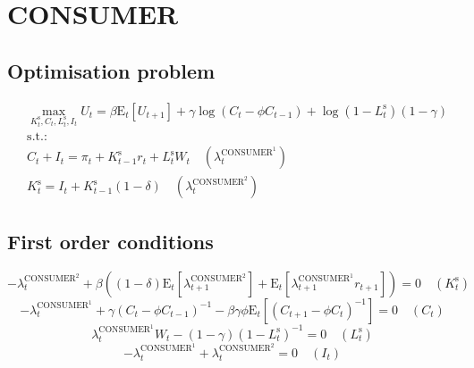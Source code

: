 

\section{CONSUMER}

\subsection{Optimisation problem}

\begin{align}
&\max_{K^{\mathrm{s}}_{t}, C_{t}, L^{\mathrm{s}}_{t}, I_{t}
} U_{t} = {\beta} {\mathrm{E}_{t}\left[U_{t+1}\right]} + {\gamma} {\log\left(C_{t} - {\phi} {C_{t-1}}\right)} + {\log\left(1 - L^{\mathrm{s}}_{t}\right)} \left(1 - \gamma\right)\\
&\mathrm{s.t.:}\nonumber\\
& C_{t} + I_{t} = \pi_{t} + {K^{\mathrm{s}}_{t-1}} {r_{t}} + {L^{\mathrm{s}}_{t}} {W_{t}} \quad \left(\lambda^{\mathrm{CONSUMER}^{\mathrm{1}}}_{t}\right)\\
& K^{\mathrm{s}}_{t} = I_{t} + {K^{\mathrm{s}}_{t-1}} \left(1 - \delta\right) \quad \left(\lambda^{\mathrm{CONSUMER}^{\mathrm{2}}}_{t}\right)
\end{align}


\subsection{First order conditions}

\begin{equation}
-\lambda^{\mathrm{CONSUMER}^{\mathrm{2}}}_{t} + {\beta} \left(\left(1 - \delta\right) {\mathrm{E}_{t}\left[\lambda^{\mathrm{CONSUMER}^{\mathrm{2}}}_{t+1}\right]} + \mathrm{E}_{t}\left[{\lambda^{\mathrm{CONSUMER}^{\mathrm{1}}}_{t+1}} {r_{t+1}}\right]\right) = 0
 \quad \left(K^{\mathrm{s}}_{t}\right)
\end{equation}
\begin{equation}
-\lambda^{\mathrm{CONSUMER}^{\mathrm{1}}}_{t} + {\gamma} \left(C_{t} - {\phi} {C_{t-1}}\right)^{-1} - {\beta} {\gamma} {\phi} {\mathrm{E}_{t}\left[\left(C_{t+1} - {\phi} {C_{t}}\right)^{-1}\right]} = 0
 \quad \left(C_{t}\right)
\end{equation}
\begin{equation}
{\lambda^{\mathrm{CONSUMER}^{\mathrm{1}}}_{t}} {W_{t}} - \left(1 - \gamma\right) \left(1 - L^{\mathrm{s}}_{t}\right)^{-1} = 0
 \quad \left(L^{\mathrm{s}}_{t}\right)
\end{equation}
\begin{equation}
-\lambda^{\mathrm{CONSUMER}^{\mathrm{1}}}_{t} + \lambda^{\mathrm{CONSUMER}^{\mathrm{2}}}_{t} = 0
 \quad \left(I_{t}\right)
\end{equation}




